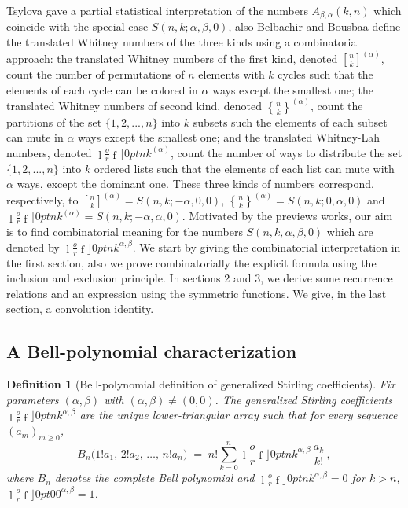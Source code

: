 \documentclass{article}
\newcommand {\stirlingf}[2]{\genfrac[]{0pt}{}{#1}{#2}}
\newcommand {\stirlings}[2]{\genfrac\{\}{0pt}{}{#1}{#2}}
\newcommand {\lah}[2]{\genfrac\lfloor \rfloor{0pt}{}{#1}{#2}}
\newtheorem{definition}[theorem]{Definition}
\begin{document}
Tsylova \cite{Tsy4285} gave a partial statistical interpretation of the numbers $%
A_{\beta ,\alpha }\left( k,n\right) $ which coincide with the special case $%
S\left( n,k;\alpha ,\beta ,0\right) $, also Belbachir and Bousbaa \cite{MR25}
define the translated Whitney numbers of the three kinds using a
combinatorial approach: the translated Whitney numbers of the first kind,
denoted $\stirlingf{n}{k}^{(\alpha )}$, count the number of
permutations of $n$ elements with $k$ cycles such that the elements of each
cycle can be colored in $\alpha $ ways except the smallest one; the
translated Whitney numbers of second kind, denoted $\stirlings{n}{k}^{(\alpha )}$,
count the partitions of the set $\{1,2,...,n\}$ into $k$
subsets such the elements of each subset can mute in $\alpha $ ways except
the smallest one; and the translated Whitney-Lah numbers, denoted $%
\lah{n}{k}^{(\alpha )}$, count the number of ways to
distribute the set $\{1,2,...,n\}$ into $k$ ordered lists such that the
elements of each list can mute with $\alpha $ ways, except the dominant one.
These three kinds of numbers correspond, respectively, to $\stirlingf{n}{k}%
^{(\alpha )}=S(n,k;-\alpha ,0,0)$, $\stirlings{n}{k}^{(\alpha
)}=S(n,k;0,\alpha ,0)$ and $\lah{n}{k}^{(\alpha
)}=S(n,k;-\alpha ,\alpha ,0)$. Motivated by the previews works, our aim is
to find combinatorial meaning for the numbers $S\left( n,k,\alpha
,\beta ,0\right) $ which are denoted by $\lah{n}{k}^{\alpha ,\beta }$. We start by giving the combinatorial
interpretation in the first section, also we prove combinatorially the
explicit formula using the inclusion and exclusion principle. In sections 2
and 3, we derive some recurrence relations and an expression using the
symmetric functions. We give, in the last section, a convolution identity.

\subsection*{A Bell-polynomial characterization}

\begin{definition}[Bell-polynomial definition of generalized Stirling coefficients]
Fix parameters $(\alpha,\beta)$ with $(\alpha,\beta)\neq(0,0)$. The generalized Stirling coefficients $\lah{n}{k}^{\alpha,\beta}$ are the unique lower-triangular array such that for every sequence $(a_m)_{m\ge 0}$,
\begin{equation}
\label{eq:BellDef}
B_n\!\big(1!a_1,\,2!a_2,\,\ldots,\,n!a_n\big)\;=\; n!\sum_{k=0}^{n}\lah{n}{k}^{\alpha,\beta}\,\frac{a_k}{k!}\,,
\end{equation}
where $B_n$ denotes the complete Bell polynomial and $\lah{n}{k}^{\alpha,\beta}=0$ for $k>n$, $\lah{0}{0}^{\alpha,\beta}=1$.
\end{definition}
\end{document}
